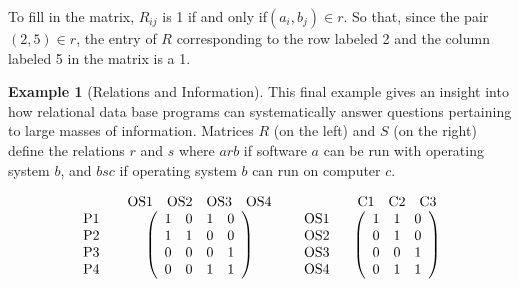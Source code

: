 \documentclass[10pt,]{book}
\theoremstyle{plain}
\theoremstyle{definition}
\theoremstyle{definition}
\theoremstyle{definition}
\newtheorem{example}[theorem]{Example}
\theoremstyle{definition}
\begin{document}
To fill in the matrix, \(R_{ij}\) is 1 if and only if\(\left(a_i,b_j\right) \in r\). So that, since the pair \((2, 5) \in r\), the entry of \(R\) corresponding to the row labeled 2 and the column labeled 5 in the matrix is a 1.%
\begin{example}[Relations and Information]\label{ex-relations-information}
This final example gives an insight into how relational data base programs can systematically answer questions pertaining to large masses of information. Matrices \(R\) (on the left) and \(S\) (on the right) define the relations \(r\) and \(s\) where
\(a r b\) if software \(a\) can be run with operating system \(b\), and \(b s c\) if operating system \(b\) can run on computer \(c\).

\begin{equation*}\begin{array}{cc}
   & 
\begin{array}{cccc}
 \text{OS1} & \text{OS2} & \text{OS3} & \text{OS4} \\
\end{array}
 \\ 
\begin{array}{c}
 \text{P1} \\
 \text{P2} \\
 \text{P3} \\
 \text{P4} \\
\end{array}
 & \left(
\begin{array}{cccc}
  1  &  0  &  1  &  0  \\
  1  &  1  & 0 & 0 \\
 0 & 0 & 0 &  1  \\
 0 & 0 &  1  &  1
\end{array}
\right) \\
\end{array}\)       \(\begin{array}{cc}
   & 
\begin{array}{ccc}
 \text{C1} & \text{C2} & \text{C3} \\
\end{array}
 \\
 
\begin{array}{c}
 \text{OS1} \\
 \text{OS2} \\
 \text{OS3} \\
 \text{OS4} \\
\end{array}
 & \left(
\begin{array}{ccc}
  1  &  1  & 0 \\
 0 &  1  & 0 \\
 0 & 0 &  1  \\
 0 &  1  &  1 
\end{array}
\right)
\end{array}\end{equation*}


\end{example}
\end{document}
